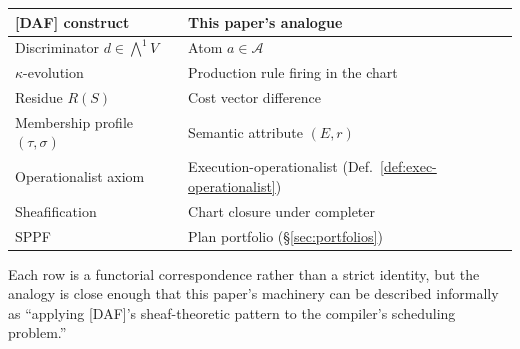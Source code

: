 \begin{center}
\small
\begin{tabular}{l|l}
\textbf{[DAF] construct} & \textbf{This paper's analogue} \\
\hline
Discriminator $d \in \bigwedge^1 V$ & Atom $a \in \mathcal{A}$ \\
$\kappa$-evolution & Production rule firing in the chart \\
Residue $R(S)$ & Cost vector difference \\
Membership profile $(\tau, \sigma)$ & Semantic attribute $(E, r)$ \\
Operationalist axiom & Execution-operationalist (Def.\ \ref{def:exec-operationalist}) \\
Sheafification & Chart closure under completer \\
SPPF & Plan portfolio (\S\ref{sec:portfolios}) \\
\end{tabular}
\end{center}

Each row is a functorial correspondence rather than
a strict identity, but the analogy is close enough
that this paper's machinery can be described
informally as ``applying [DAF]'s sheaf-theoretic
pattern to the compiler's scheduling problem.''
